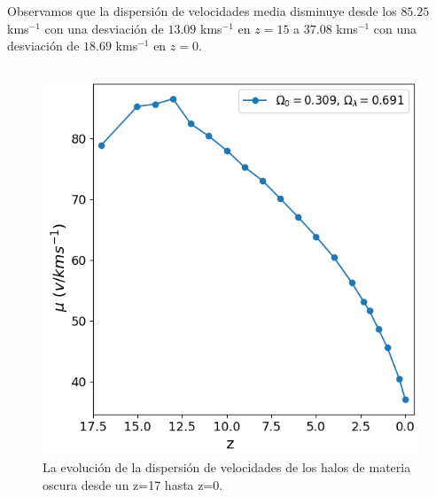 \documentclass{beamer}
\begin{document}
	\begin{frame}
		\small Observamos que la dispersión de velocidades media disminuye desde los $85.25$ kms$^{-1}$ con una desviación de $13.09$ kms$^{-1}$ en $z=15$ a $37.08$ kms$^{-1}$ con una desviación de $18.69$ kms$^{-1}$ en $z=0$.
		
		\begin{columns}[t]
			\begin{column}{.5\textwidth}
				\begin{figure}
					\centering
					\includegraphics[scale=0.3]{RunCanonica/VelDisp_Mean_RunCanonica.png}
					\caption{\footnotesize La evolución de la dispersión de velocidades de los halos de materia oscura desde un z=17 hasta z=0.}
					\label{fig:Canon-VelDispMean}
				\end{figure}
			\end{column}


\end{columns}
\end{frame}
\end{document}
